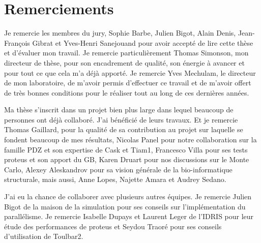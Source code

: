 \chapter*{Remerciements}

Je remercie les membres du jury, Sophie Barbe, Julien Bigot, Alain Denis, Jean-François Gibrat et Yves-Henri Sanejouand pour avoir accepté de lire cette thèse et d'évaluer mon travail. Je remercie particulièrement Thomas Simonson, mon directeur de thèse, pour son encadrement de qualité, son énergie à avancer et pour tout ce que cela m'a déjà apporté. Je remercie Yves Mechulam, le directeur de mon laboratoire, de m'avoir permis d'effectuer ce travail et de m'avoir offert de très bonnes conditions pour le réaliser tout au long de ces dernières années.

Ma thèse s'inscrit dans un projet bien plus large dans lequel beaucoup de personnes ont déjà collaboré. J'ai bénéficié de leurs travaux. Et je remercie Thomas Gaillard, pour la qualité de sa contribution au projet sur laquelle se fondent beaucoup de mes résultats, Nicolas Panel pour notre collaboration sur la famille PDZ et son expertise de Cask et Tiam1, Francesco Villa pour ses tests proteus et son apport du GB, Karen Druart pour nos discussions sur le Monte Carlo, Alexey Aleskandrov pour sa vision générale de la bio-informatique structurale, mais aussi, Anne Lopes, Najette Amara et Audrey Sedano.

J'ai eu la chance de collaborer avec plusieurs autres équipes. Je remercie Julien Bigot de la maison de la simulation pour ses conseils sur l'implémentation du parallélisme. Je remercie Isabelle Dupays et Laurent Leger de l'IDRIS pour leur étude des performances de proteus et Seydou Traoré pour ses conseils d'utilisation de Toulbar2. 


